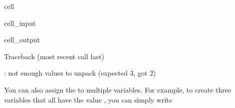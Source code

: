 \documentclass[letterpaper,10pt,english]{jupyterBook}
\begin{document}
\begin{sphinxuseclass}{cell}\begin{sphinxVerbatimInput}

\begin{sphinxuseclass}{cell_input}
\begin{sphinxVerbatim}[commandchars=\\\{\}]
     
\end{sphinxVerbatim}

\end{sphinxuseclass}\end{sphinxVerbatimInput}
\begin{sphinxVerbatimOutput}

\begin{sphinxuseclass}{cell_output}
\begin{sphinxVerbatim}[commandchars=\\\{\}]
Traceback (most recent call last)
  
      

: not enough values to unpack (expected 3, got 2)
\end{sphinxVerbatim}

\end{sphinxuseclass}\end{sphinxVerbatimOutput}

\end{sphinxuseclass}
\sphinxAtStartPar
You can also assign the  to multiple variables. For example, to create three variables that all have the value , you can simply write
\end{document}

